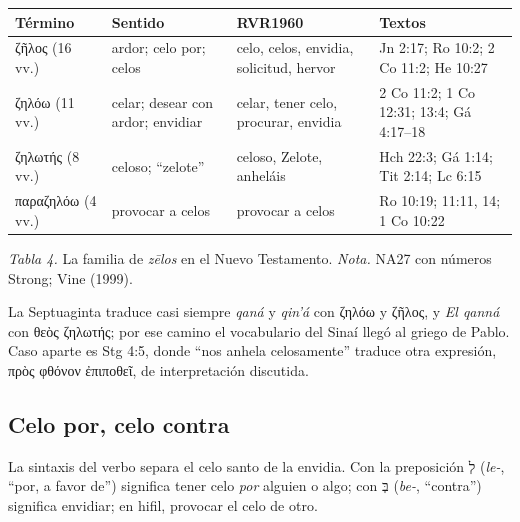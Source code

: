\documentclass[11pt,letterpaper]{article}
\newcommand{\heb}[1]{\mbox{\foreignlanguage{hebrew}{#1}}}
\newcommand{\grc}[1]{\foreignlanguage{ancientgreek}{#1}}
\begin{document}
\begin{center}\small\renewcommand{\arraystretch}{1.15}
\begin{tabular}{@{}L{2.8cm}L{3.6cm}L{3.6cm}L{3.8cm}@{}}
\toprule
\textbf{Término} & \textbf{Sentido} & \textbf{RVR1960} & \textbf{Textos} \\ \midrule
\grc{ζῆλος} (16 vv.) & ardor; celo por; celos & celo, celos, envidia, solicitud, hervor & Jn 2:17; Ro 10:2; 2 Co 11:2; He 10:27 \\
\grc{ζηλόω} (11 vv.) & celar; desear con ardor; envidiar & celar, tener celo, procurar, envidia & 2 Co 11:2; 1 Co 12:31; 13:4; Gá 4:17--18 \\
\grc{ζηλωτής} (8 vv.) & celoso; ``zelote'' & celoso, Zelote, anheláis & Hch 22:3; Gá 1:14; Tit 2:14; Lc 6:15 \\
\grc{παραζηλόω} (4 vv.) & provocar a celos & provocar a celos & Ro 10:19; 11:11, 14; 1 Co 10:22 \\
\bottomrule
\end{tabular}\par
{\footnotesize\color{gris}\textit{Tabla 4.} La familia de \emph{zēlos} en el Nuevo Testamento. \textit{Nota.} NA27 con números Strong; Vine (1999).}
\end{center}

La Septuaginta traduce casi siempre \emph{qaná} y \emph{qin'á} con \grc{ζηλόω} y \grc{ζῆλος}, y \emph{El qanná} con \grc{θεὸς ζηλωτής}; por ese camino el vocabulario del Sinaí llegó al griego de Pablo. Caso aparte es Stg 4:5, donde ``nos anhela celosamente'' traduce otra expresión, \grc{πρὸς φθόνον ἐπιποθεῖ}, de interpretación discutida.

\subsection{Celo por, celo contra}
La sintaxis del verbo separa el celo santo de la envidia. Con la preposición \heb{לְ} (\emph{le-}, ``por, a favor de'') significa tener celo \emph{por} alguien o algo; con \heb{בְּ} (\emph{be-}, ``contra'') significa envidiar; en hifil, provocar el celo de otro.
\end{document}
